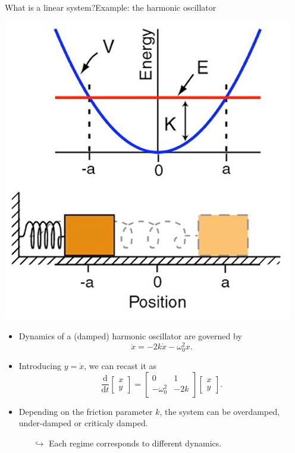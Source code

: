 \documentclass[usenames,dvipsnames,svgnames,10pt,aspectratio=169]{beamer}
\begin{document}
\begin{frame}[t, c]{What is a linear system?}{Example: the harmonic oscillator}
	\begin{minipage}{.38\textwidth}
		\centering
		\includegraphics[width=.8\textwidth]{harmonic_oscillator}
	\end{minipage}%
	\hfill
	\begin{minipage}{.58\textwidth}
		\begin{itemize}
			\item Dynamics of a (damped) harmonic oscillator are governed by
			\[
				\ddot{x} = -2k \dot{x} - \omega_0^2 x.
			\]

			\medskip

			\item Introducing \( y = \dot{x} \), we can recast it as
			\[
				\displaystyle \frac{\mathrm{d}}{\mathrm{d}t} \begin{bmatrix} x \\ y \end{bmatrix} = \begin{bmatrix} 0 & 1 \\ -\omega_0^2 & -2k \end{bmatrix} \begin{bmatrix} x \\ y \end{bmatrix}.
			\]

			\medskip

			\item Depending on the friction parameter \(k\), the system can be overdamped, under-damped or criticaly damped.
			\begin{itemize}
				\item[\( \hookrightarrow \)] Each regime corresponds to different dynamics.
			\end{itemize}
		\end{itemize}
	\end{minipage}

	\vspace{1cm}
\end{frame}
\end{document}
